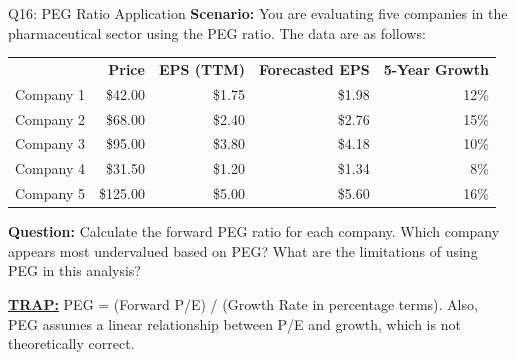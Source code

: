 \documentclass{beamer}
\renewcommand{\scriptsize}{\fontsize{6pt}{7pt}\selectfont}
\begin{document}
	\begin{frame}{Q16: PEG Ratio Application}
		\scriptsize
		\textbf{Scenario:} You are evaluating five companies in the pharmaceutical sector using the PEG ratio. The data are as follows:
		
		\begin{tabular}{lrrrr}
			& \textbf{Price} & \textbf{EPS (TTM)} & \textbf{Forecasted EPS} & \textbf{5-Year Growth} \\
			Company 1 & \$42.00 & \$1.75 & \$1.98 & 12\% \\
			Company 2 & \$68.00 & \$2.40 & \$2.76 & 15\% \\
			Company 3 & \$95.00 & \$3.80 & \$4.18 & 10\% \\
			Company 4 & \$31.50 & \$1.20 & \$1.34 & 8\% \\
			Company 5 & \$125.00 & \$5.00 & \$5.60 & 16\% \\
		\end{tabular}
		
		\textbf{Question:} Calculate the forward PEG ratio for each company. Which company appears most undervalued based on PEG? What are the limitations of using PEG in this analysis?
		
		\vspace{2pt}
		\underline{\textbf{TRAP:}} PEG = (Forward P/E) / (Growth Rate in percentage terms). Also, PEG assumes a linear relationship between P/E and growth, which is not theoretically correct.
	\end{frame}
	
\end{document}
